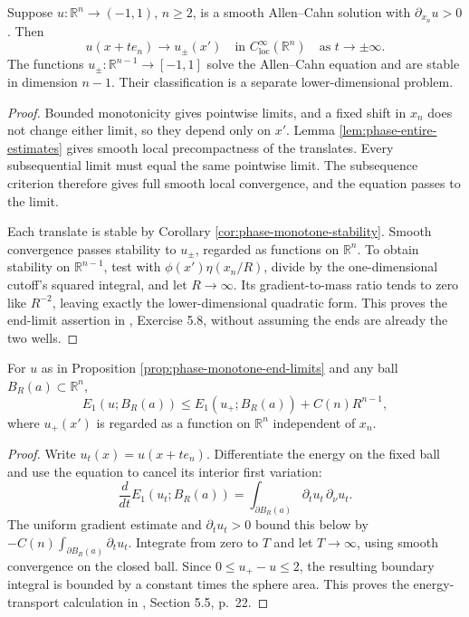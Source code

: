 \begin{proposition}\label{prop:phase-monotone-end-limits}
Suppose $u:\mathbb R^n\to(-1,1)$, $n\geq2$, is a smooth Allen--Cahn solution with $\partial_{x_n}u>0$. Then
\[
 u(x+te_n)\longrightarrow u_\pm(x')\quad\text{in }C^\infty_{\mathrm{loc}}(\mathbb R^n)
 \quad\text{as }t\to\pm\infty.
\]
The functions $u_\pm:\mathbb R^{n-1}\to[-1,1]$ solve the Allen--Cahn equation and are stable in dimension $n-1$. Their classification is a separate lower-dimensional problem.
\end{proposition}
\begin{proof}
Bounded monotonicity gives pointwise limits, and a fixed shift in $x_n$ does not change either limit, so they depend only on $x'$. Lemma \ref{lem:phase-entire-estimates} gives smooth local precompactness of the translates. Every subsequential limit must equal the same pointwise limit. The subsequence criterion therefore gives full smooth local convergence, and the equation passes to the limit.

Each translate is stable by Corollary \ref{cor:phase-monotone-stability}. Smooth convergence passes stability to $u_\pm$, regarded as functions on $\mathbb R^n$. To obtain stability on $\mathbb R^{n-1}$, test with $\phi(x')\eta(x_n/R)$, divide by the one-dimensional cutoff's squared integral, and let $R\to\infty$. Its gradient-to-mass ratio tends to zero like $R^{-2}$, leaving exactly the lower-dimensional quadratic form. This proves the end-limit assertion in \cite{ChAC}, Exercise 5.8, without assuming the ends are already the two wells.
\end{proof}

\begin{proposition}\label{prop:phase-translation-energy}
For $u$ as in Proposition \ref{prop:phase-monotone-end-limits} and any ball $B_R(a)\subset\mathbb R^n$,
\[
 E_1(u;B_R(a))\leq E_1(u_+;B_R(a))+C(n)R^{n-1},
\]
where $u_+(x')$ is regarded as a function on $\mathbb R^n$ independent of $x_n$.
\end{proposition}
\begin{proof}
Write $u_t(x)=u(x+te_n)$. Differentiate the energy on the fixed ball and use the equation to cancel its interior first variation:
\[
 \frac d{dt}E_1(u_t;B_R(a))
 =\int_{\partial B_R(a)}\partial_tu_t\,\partial_\nu u_t.
\]
The uniform gradient estimate and $\partial_tu_t>0$ bound this below by $-C(n)\int_{\partial B_R(a)}\partial_tu_t$. Integrate from zero to $T$ and let $T\to\infty$, using smooth convergence on the closed ball. Since $0\leq u_+-u\leq2$, the resulting boundary integral is bounded by a constant times the sphere area. This proves the energy-transport calculation in \cite{ChAC}, Section 5.5, p.~22.
\end{proof}

